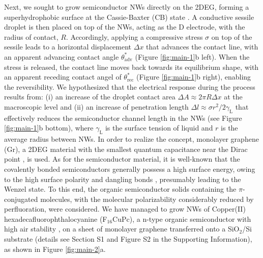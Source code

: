 Next, we sought to grow semiconductor NWs directly on the 2DEG,
forming a superhydrophobic surface at the Cassie-Baxter (CB) state
\cite{Cassie_1944}. A conductive sessile droplet is then placed on top
of the NWs, acting as the D electrode, with the radius of contact,
\(R\). Accordingly, applying a compressive stress \(\sigma\) on top
of the sessile leads to a horizontal displacement \(\Delta x\) that
advances the contact line, with an apparent advancing contact angle
\(\theta_{\mathrm{adv}}^{*}\) (Figure \ref{fig:main-1}b left). When the
stress is released, the contact line moves back towards its
equilibrium shape, with an apparent receding contact angel of
\(\theta_{\mathrm{rec}}^{*}\) (Figure \ref{fig:main-1}b right), enabling the
reversibility. We hypothesized that the electrical response during the
process results from: (i) an increase of the droplet contact area
\(\Delta A \approx 2 \pi R \Delta x\) at the macroscopic level and (ii)
an increase of penetration length \(\Delta l \approx \sigma
r^{2}/2\gamma_{\mathrm{L}}\) that effectively reduces the semiconductor
channel length in the NWs (see Figure  \ref{fig:main-1}b bottom), where
\(\gamma_{\mathrm{L}}\) is the surface tension of liquid and \(r\) is the
average radius between NWs.  In order to realize the concept,
monolayer graphene (Gr), a 2DEG material with the smallest quantum
capacitance near the Dirac point \cite{Tian_2016}, is used. As for the
semiconductor material, it is well-known that the covalently bonded
semiconductors generally possess a high surface energy, owing to the
high surface polarity \cite{Azimi_2013_wetting_RO} and dangling bonds
\cite{Zhang_2004_dangling}, presumably leading to the Wenzel state. To
this end, the organic semiconductor solids containing the
\(\pi\)-conjugated molecules, with the molecular polarizability
considerably reduced by perfluoration, were considered. We have
managed to grow NWs of Copper(II) hexadecafluorophthalocyanine
(F\(_{\text{16}}\)CuPc), a n-type organic semiconductor with high air stability
\cite{Bao_1998}, on a sheet of monolayer graphene transferred onto a
SiO\(_{\text{2}}\)/Si substrate (details see Section S1 and 
Figure S2 in the Supporting Information), as shown in Figure \ref{fig:main-2}a.

